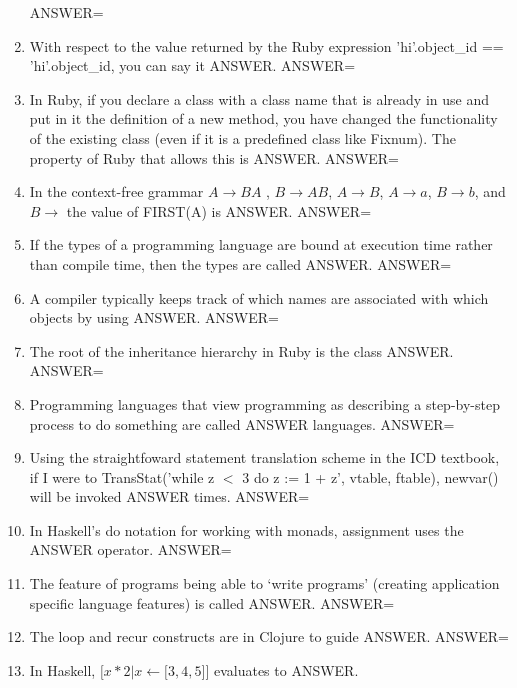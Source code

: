 \documentclass{exam}
\begin{document}
\begin{enumerate}
ANSWER=
\item With respect to the value returned by the Ruby expression 'hi'.object\_id == 'hi'.object\_id, you can say it ANSWER.\newline
ANSWER=
\item In Ruby, if you declare a class with a class name that is already in use and put in it the definition of a new method, you have changed the functionality of the existing class (even if it is a predefined class like Fixnum).  The property of Ruby that allows this is ANSWER.\newline
ANSWER=
\item In the context-free grammar $A \rightarrow B A$ , $B \rightarrow A B$, $A \rightarrow B$, $A \rightarrow a$, $B \rightarrow b$, and $B \rightarrow$  the value of FIRST(A) is ANSWER.\newline
ANSWER=
\item If the types of a programming language are bound at execution time rather than compile time, then the types are called ANSWER.\newline
ANSWER=
\item A compiler typically keeps track of which names are associated with which objects by using ANSWER.\newline
ANSWER=
\item The root of the inheritance hierarchy in Ruby is the class ANSWER.\newline
ANSWER=
\item Programming languages that view programming as describing a step-by-step process to do something are called ANSWER languages.\newline
ANSWER=
\item Using the straightfoward statement translation scheme in the ICD textbook, if I were to TransStat('while z $<$ 3 do z := 1 + z', vtable, ftable), newvar() will be invoked ANSWER times.\newline
ANSWER=
\item In Haskell's do notation for working with monads, assignment uses the ANSWER operator.\newline
ANSWER=
\item The feature of programs being able to `write programs' (creating application specific language features) is called ANSWER.\newline
ANSWER=
\item The loop and recur constructs are in Clojure to guide ANSWER.\newline
ANSWER=
\item In Haskell, $\lbrack x * 2 | x \leftarrow \lbrack 3, 4, 5\rbrack \rbrack$  evaluates to ANSWER.\newline

\end{enumerate}
\end{document}
